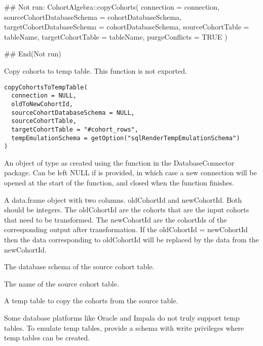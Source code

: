 \documentclass[a4paper]{book}
\begin{document}
%
\begin{Examples}
\begin{ExampleCode}
## Not run: 
CohortAlgebra::copyCohorts(
  connection = connection,
  sourceCohortDatabaseSchema = cohortDatabaseSchema,
  targetCohortDatabaseSchema = cohortDatabaseSchema,
  sourceCohortTable = tableName,
  targetCohortTable = tableName,
  purgeConflicts = TRUE
)

## End(Not run)

\end{ExampleCode}
\end{Examples}
%
\begin{Description}\relax
Copy cohorts to temp table. This function is not exported.

\strong{[Stable]}
\end{Description}
%
\begin{Usage}
\begin{verbatim}
copyCohortsToTempTable(
  connection = NULL,
  oldToNewCohortId,
  sourceCohortDatabaseSchema = NULL,
  sourceCohortTable,
  targetCohortTable = "#cohort_rows",
  tempEmulationSchema = getOption("sqlRenderTempEmulationSchema")
)
\end{verbatim}
\end{Usage}
%
\begin{Arguments}
\begin{ldescription}
\item[\code{connection}] An object of type  as created using the
 function in the
DatabaseConnector package. Can be left NULL if 
is provided, in which case a new connection will be opened at the start
of the function, and closed when the function finishes.

\item[\code{oldToNewCohortId}] A data.frame object with two columns. oldCohortId and newCohortId. Both should be integers.
The oldCohortId are the cohorts that are the input cohorts that need to be transformed.
The newCohortId are the cohortIds of the corresponding output after transformation.
If the oldCohortId = newCohortId then the data corresponding to oldCohortId
will be replaced by the data from the newCohortId.

\item[\code{sourceCohortDatabaseSchema}] The database schema of the source cohort table.

\item[\code{sourceCohortTable}] The name of the source cohort table.

\item[\code{targetCohortTable}] A temp table to copy the cohorts from the source table.

\item[\code{tempEmulationSchema}] Some database platforms like Oracle and Impala do not truly support
temp tables. To emulate temp tables, provide a schema with write
privileges where temp tables can be created.
\end{ldescription}
\end{Arguments}
\end{document}
